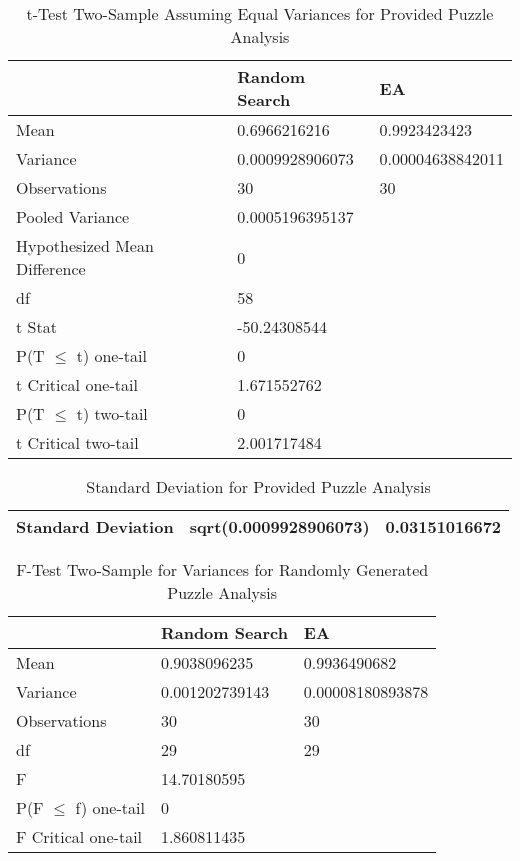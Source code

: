 \documentclass[11pt]{article}
\begin{document}
\begin{table}[H]
\centering
\caption{t-Test Two-Sample Assuming Equal Variances for Provided Puzzle Analysis}
\label{my-label}
\begin{tabular}{l|l|l}
 & Random Search & EA \\ \hline
Mean & 0.6966216216 & 0.9923423423 \\
Variance & 0.0009928906073 & 0.00004638842011 \\
Observations & 30 & 30 \\
Pooled Variance & 0.0005196395137 &  \\
Hypothesized Mean Difference & 0 &  \\
df & 58 &  \\
t Stat & -50.24308544 &  \\
P(T $\leq$ t) one-tail & 0 &  \\
t Critical one-tail & 1.671552762 &  \\
P(T $\leq$ t) two-tail & 0 &  \\
t Critical two-tail & 2.001717484 &
\end{tabular}
\end{table}

\begin{table}[H]
\centering
\caption{Standard Deviation for Provided Puzzle Analysis}
\label{my-label}
\begin{tabular}{|l|l|l|}
\hline
Standard Deviation & sqrt(0.0009928906073) & 0.03151016672 \\ \hline
\end{tabular}
\end{table}


\begin{table}[H]
\centering
\caption{F-Test Two-Sample for Variances for Randomly Generated Puzzle Analysis}
\label{my-label}
\begin{tabular}{l|l|l}
 & Random Search & EA \\ \hline
Mean & 0.9038096235 & 0.9936490682 \\
Variance & 0.001202739143 & 0.00008180893878 \\
Observations & 30 & 30 \\
df & 29 & 29 \\
F & 14.70180595 &  \\
P(F $\leq$ f) one-tail & 0 &  \\
F Critical one-tail & 1.860811435 & 
\end{tabular}
\end{table}
\end{document}
